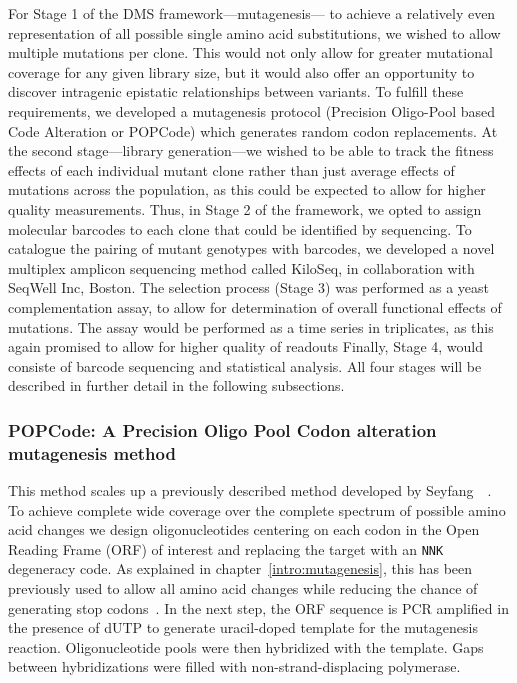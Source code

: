 For Stage 1 of the DMS framework---mutagenesis--- to achieve a relatively even representation of all possible single amino acid substitutions, we wished to allow multiple mutations per clone. This would not only allow for greater mutational coverage for any given library size, but it would also offer an opportunity to discover intragenic epistatic relationships between variants.  To fulfill these requirements, we developed a mutagenesis protocol (Precision Oligo-Pool based Code Alteration or POPCode) which generates random codon replacements. 
At the second stage---library generation---we wished to be able to track the fitness effects of each individual mutant clone rather than just average effects of mutations across the population, as this could be expected to allow for higher quality measurements. Thus, in Stage 2 of the framework, we opted to assign molecular barcodes to each clone that could be identified by sequencing. To catalogue the pairing of mutant genotypes with barcodes, we developed a novel multiplex amplicon sequencing method called KiloSeq, in collaboration with SeqWell Inc, Boston. 
The selection process (Stage 3) was performed as a yeast complementation assay, to allow for determination of overall functional effects of mutations. The assay would be performed as a time series in triplicates, as this again promised to allow for higher quality of readouts 
Finally, Stage 4, would consiste of barcode sequencing and statistical analysis. All four stages will be described in further detail in the following subsections.


\subsubsection{POPCode: A Precision Oligo Pool Codon alteration mutagenesis method}

This method scales up a previously described method developed by Seyfang~\etal~\cite{seyfang_multiple_2004}. To achieve complete wide coverage over the complete spectrum of possible amino acid changes we design oligonucleotides centering on each codon in the Open Reading Frame (ORF) of interest and replacing the target with an \texttt{NNK} degeneracy code. As explained in chapter~\ref{intro:mutagenesis}, this has been previously used to allow all amino acid changes while reducing the chance of generating stop codons~\cite{pal_methods_2005}. 
In the next step, the ORF sequence is PCR amplified in the presence of dUTP to generate uracil-doped template for the mutagenesis reaction. Oligonucleotide pools were then hybridized with the template. Gaps between hybridizations were filled with non-strand-displacing polymerase. 

